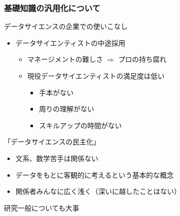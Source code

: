 \documentclass[unicode,12pt]{beamer}%
\begin{document}
\begin{frame}
    \frametitle{基礎知識の汎用化について}
        \begin{exampleblock}{データサイエンスの企業での使いこなし}
            \begin{itemize}
                \item データサイエンティストの中途採用
                \begin{itemize}
                    \item マネージメントの難しさ $\Rightarrow$ プロの持ち腐れ
                    \item 現役データサイエンティストの満足度は低い
                    \begin{itemize}
                        \item 手本がない
                        \item 周りの理解がない
                        \item スキルアップの時間がない
                    \end{itemize}
                \end{itemize}
            \end{itemize}
        \end{exampleblock}
        \begin{alertblock}{「データサイエンスの民主化」}
            \begin{itemize}
                \item 文系、数学苦手は関係ない
                \item データをもとに客観的に考えるという基本的な概念
                \item 関係者みんなに広く浅く（深いに越したことはない）
            \end{itemize}
        \end{alertblock}
        \centering
        \Large{\alert{研究一般についても大事}}
\end{frame}
\end{document}
